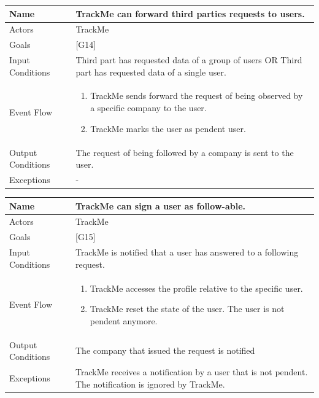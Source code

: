 \documentclass{article}
\begin{document}
\begin{center}
    \begin{tabular}{ | l | p{10cm} |}
    \hline
    Name & TrackMe can forward third parties requests to users. \\ \hline
    Actors & TrackMe\\ \hline
   	Goals & {[G14]}\\ \hline
    Input Conditions & Third part has requested data of a group of users OR Third part has requested data of a single user.\\ \hline
    Event Flow & \begin{enumerate}
    	\item TrackMe sends forward the request of being observed by a specific company to the user.
    	\item TrackMe marks the user as pendent user.
    \end{enumerate} \\ \hline
    Output Conditions & The request of being followed by a company is sent to the user. \\ \hline
    Exceptions & -    \\ \hline
    \end{tabular}
\end{center}

\begin{center}
    \begin{tabular}{ | l | p{10cm} |}
    \hline
    Name & TrackMe can sign a user as follow-able. \\ \hline
    Actors & TrackMe\\ \hline
   	Goals & {[G15]}\\ \hline
    Input Conditions & TrackMe is notified that a user has answered to a following request.\\ \hline
    Event Flow & \begin{enumerate}
    	\item TrackMe accesses the profile relative to the specific user.
    	\item TrackMe reset the state of the user. The user is not pendent anymore.
    \end{enumerate} \\ \hline
    Output Conditions & The company that issued the request is notified \\ \hline
    Exceptions & TrackMe receives a notification by a user that is not pendent. The notification is ignored by TrackMe.\\ \hline
    \end{tabular}
\end{center}
\end{document}
